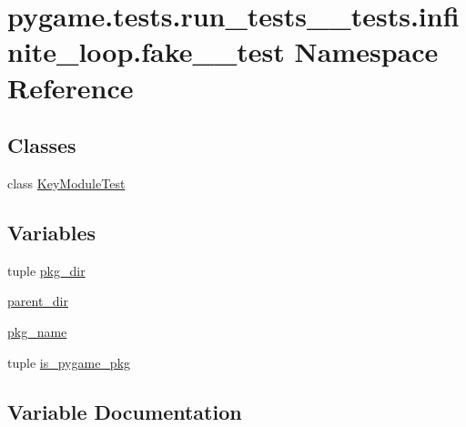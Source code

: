 \hypertarget{namespacepygame_1_1tests_1_1run__tests____tests_1_1infinite__loop_1_1fake__1__test}{}\section{pygame.\+tests.\+run\+\_\+tests\+\_\+\+\_\+tests.\+infinite\+\_\+loop.\+fake\+\_\+\_\+test Namespace Reference}
\label{namespacepygame_1_1tests_1_1run__tests____tests_1_1infinite__loop_1_1fake__1__test}
\subsection*{Classes}
\begin{DoxyCompactItemize}
\item 
class \hyperlink{classpygame_1_1tests_1_1run__tests____tests_1_1infinite__loop_1_1fake__1__test_1_1_key_module_test}{Key\+Module\+Test}
\end{DoxyCompactItemize}
\subsection*{Variables}
\begin{DoxyCompactItemize}
\item 
tuple \hyperlink{namespacepygame_1_1tests_1_1run__tests____tests_1_1infinite__loop_1_1fake__1__test_a4f1cd909e1704f85e701790ebea4b54f}{pkg\+\_\+dir}
\item 
\hyperlink{namespacepygame_1_1tests_1_1run__tests____tests_1_1infinite__loop_1_1fake__1__test_a2488b4313a2457a27a34f8b4f5969c3b}{parent\+\_\+dir}
\item 
\hyperlink{namespacepygame_1_1tests_1_1run__tests____tests_1_1infinite__loop_1_1fake__1__test_a93df9514b9d950cc7b01b35174ffe85d}{pkg\+\_\+name}
\item 
tuple \hyperlink{namespacepygame_1_1tests_1_1run__tests____tests_1_1infinite__loop_1_1fake__1__test_aeb4ba84249eadab5fc335f21ed85a367}{is\+\_\+pygame\+\_\+pkg}
\end{DoxyCompactItemize}


\subsection{Variable Documentation}
\mbox{\label{namespacepygame_1_1tests_1_1run__tests____tests_1_1infinite__loop_1_1fake__1__test_aeb4ba84249eadab5fc335f21ed85a367}} 
